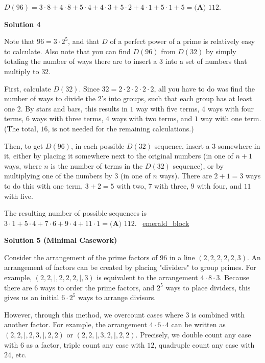 \begin{enumerate}
 $D(96)=3 \cdot 8+4 \cdot 8+5 \cdot 4+4 \cdot 3+5 \cdot 2+4 \cdot 1+5 \cdot 1+5=\boxed{\textbf{(A) } 112}$.  

 



\textbf{Solution 4}

Note that $96 = 3 \cdot 2^5$, and that $D$ of a perfect power of a prime is relatively easy to calculate. Also note that you can find $D(96)$ from $D(32)$ by simply totaling the number of ways there are to insert a $3$ into a set of numbers that multiply to $32$.

 First, calculate $D(32)$. Since $32 = 2 \cdot 2 \cdot 2 \cdot 2 \cdot 2$, all you have to do was find the number of ways to divide the $2$'s into groups, such that each group has at least one $2$. By stars and bars, this results in $1$ way with five terms, $4$ ways with four terms, $6$ ways with three terms, $4$ ways with two terms, and $1$ way with one term. (The total, $16$, is not needed for the remaining calculations.)

 Then, to get $D(96)$, in each possible $D(32)$ sequence, insert a $3$ somewhere in it, either by placing it somewhere next to the original numbers (in one of $n+1$ ways, where $n$ is the number of terms in the $D(32)$ sequence), or by multiplying one of the numbers by $3$ (in one of $n$ ways). There are $2+1=3$ ways to do this with one term, $3+2=5$ with two, $7$ with three, $9$ with four, and $11$ with five.

 The resulting number of possible sequences is $3 \cdot 1 + 5 \cdot 4 + 7 \cdot 6 + 9 \cdot 4 + 11 \cdot 1 = \boxed{\textbf{(A) }112}$. ~\href{https://artofproblemsolving.com/wiki/index.php?title=User:Emerald\_block}{emerald\_block}

 



\textbf{Solution 5 (Minimal Casework)}

Consider the arrangement of the prime factors of 96 in a line $(2,2, 2, 2, 2, 3)$.  An arrangement of factors can be created by placing "dividers" to group primes.  For example, $(2, 2, |, 2, 2, 2, |, 3)$ is equivalent to the arrangement $4 \cdot 8 \cdot 3$.  Because there are $6$ ways to order the prime factors, and $2^5$ ways to place dividers, this gives us an initial $6 \cdot  2^5$ ways to arrange divisors.  

 However, through this method, we overcount cases where $3$ is combined with another factor.  For example, the arrangement $4 \cdot 6 \cdot 4$ can be written as $(2, 2, |, 2, 3, |, 2, 2)$ or $(2, 2, |, 3, 2, |, 2, 2)$.  Precisely, we double count any case with $6$ as a factor, triple count any case with $12$, quadruple count any case with $24$, etc.    


\end{enumerate}
